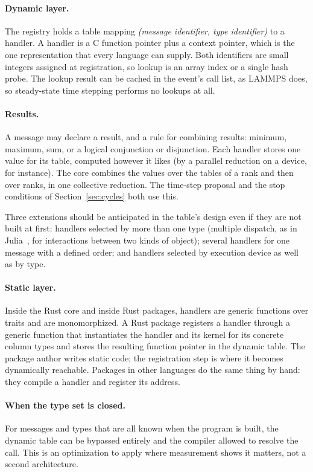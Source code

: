 \documentclass[11pt,a4paper]{article}
\begin{document}
\paragraph{Dynamic layer.}  The registry holds a table mapping
\emph{(message identifier, type identifier)} to a handler.  A handler is a C
function pointer plus a context pointer, which is the one representation that
every language can supply.  Both identifiers are small integers assigned at
registration, so lookup is an array index or a single hash probe.  The lookup
result can be cached in the event's call list, as LAMMPS does, so steady-state
time stepping performs no lookups at all.

\paragraph{Results.}  A message may declare a result, and a rule for
combining results: minimum, maximum, sum, or a logical conjunction or
disjunction.  Each handler stores one value for its table, computed however
it likes (by a parallel reduction on a device, for instance).  The core
combines the values over the tables of a rank and then over ranks, in one
collective reduction.  The time-step proposal and the stop conditions of
Section~\ref{sec:cycles} both use this.

Three extensions should be anticipated in the table's design even if they are
not built at first: handlers selected by more than one type (multiple
dispatch, as in Julia~\cite{julia}, for interactions between two kinds of
object); several handlers for one message with a defined order; and handlers
selected by execution device as well as by type.

\paragraph{Static layer.}  Inside the Rust core and inside Rust packages,
handlers are generic functions over traits and are monomorphized.  A Rust
package registers a handler through a generic function that instantiates the
handler and its kernel for its concrete column types and stores the resulting function
pointer in the dynamic table.  The package author writes static code; the
registration step is where it becomes dynamically reachable.  Packages in
other languages do the same thing by hand: they compile a handler and register
its address.

\paragraph{When the type set is closed.}  For messages and types that are all
known when the program is built, the dynamic table can be bypassed entirely
and the compiler allowed to resolve the call.  This is an optimization to
apply where measurement shows it matters, not a second architecture.
\end{document}
